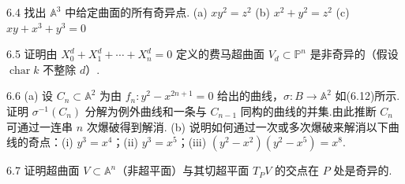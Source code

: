 6.4 找出 \(\mathbb{A}^3\) 中给定曲面的所有奇异点.
(a) \(xy^2 = z^2\)
(b) \(x^2 + y^2 = z^2\)
(c) \(xy + x^3 + y^3 = 0\)

6.5 证明由 \(X_0^d + X_1^d + \cdots + X_n^d = 0\) 定义的费马超曲面 \(V_d \subset \mathbb{P}^n\) 是非奇异的（假设 \(\operatorname{char} k\) 不整除 \(d\)）.

6.6 (a) 设 \(C_n \subset \mathbb{A}^2\) 为由 \(f_n: y^2 - x^{2n+1} = 0\) 给出的曲线，\(\sigma: B \to \mathbb{A}^2\) 如(6.12)所示.证明 \({\sigma}^{-1}(C_n)\) 分解为例外曲线和一条与 \(C_{n-1}\) 同构的曲线的并集.由此推断 \(C_n\) 可通过一连串 \(n\) 次爆破得到解消.
(b) 说明如何通过一次或多次爆破来解消以下曲线的奇点：(i) \(y^3 = x^4\)；(ii) \(y^3 = x^5\)；(iii) \((y^2 - x^2)(y^2 - x^5) = x^8\).

6.7 证明超曲面 \(V \subset \mathbb{A}^n\)（非超平面）与其切超平面 \(T_P V\) 的交点在 \(P\) 处是奇异的.
